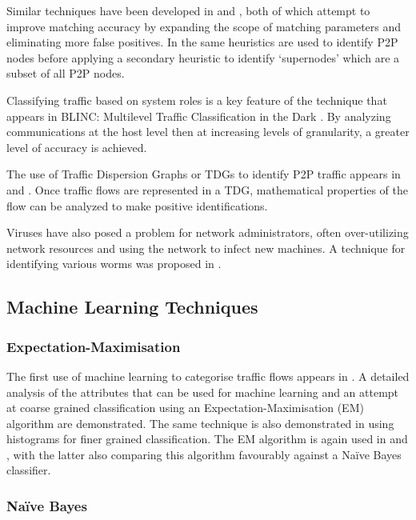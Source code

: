 \documentclass{ecuthesis}
\begin{document}
Similar techniques have been developed in \citep{Perenyi:2006p6325} and \citep{John:2008p1376}, both of which attempt to improve matching accuracy by expanding the scope of matching parameters and eliminating more false positives. In \cite{Oneil:2004p6451} the same heuristics are used to identify P2P nodes before applying a secondary heuristic to identify ‘supernodes’ which are a subset of all P2P nodes.

Classifying traffic based on system roles is a key feature of the technique that appears in BLINC: Multilevel Traffic Classification in the Dark \citep{Karagiannis:2005p6359}. By analyzing communications at the host level then at increasing levels of granularity, a greater level of accuracy is achieved.

The use of Traffic Dispersion Graphs or TDGs to identify P2P traffic appears in \cite{Iliofotou:2008p6373} and \cite{Iliofotou:2009p6461}. Once traffic flows are represented in a TDG, mathematical properties of the flow can be analyzed to make positive identifications.

Viruses have also posed a problem for network administrators, often over-utilizing network resources and using the network to infect new machines. A technique for identifying various worms was proposed in \cite{Lazarevic:2003p6450}.

\subsection{Machine Learning Techniques}

\subsubsection{Expectation-Maximisation}

The first use of machine learning to categorise traffic flows appears in \cite{McGregor:2004p3826}. A detailed analysis of the attributes that can be used for machine learning and an attempt at coarse grained classification using an Expectation-Maximisation (EM) algorithm are demonstrated. The same technique is also demonstrated in \cite{Soule:2004p3817} using histograms for finer grained classification. The EM algorithm is again used in \cite{Zander:2005p6212} and \cite{Erman:2006p3825}, with the latter also comparing this algorithm favourably against a Naïve Bayes classifier.

\subsubsection{Naïve Bayes}
\end{document}

